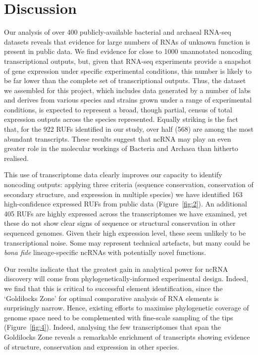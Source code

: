 \documentclass[10pt]{article}
\begin{document}
\section*{Discussion}

Our analysis of over 400 publicly-available bacterial and archaeal
RNA-seq datasets reveals that evidence for large numbers of RNAs of
unknown function is present in public data. We find evidence for close
to 1000 unannotated noncoding transcriptional outputs, but, given that
RNA-seq experiments provide a snapshot of gene expression under
specific experimental conditions, this number is likely to be far
lower than the complete set of transcriptional outputs. Thus, the
dataset we assembled for this project, which includes data generated
by a number of labs and derives from various species and strains grown
under a range of experimental conditions, is expected to represent a
broad, though partial, census of total expression outputs across the
species represented. Equally striking is the fact that, for the 922
RUFs identified in our study, over half (568) are among the most
abundant transcripts. These results suggest that ncRNA may play an
even greater role in the molecular workings of Bacteria and Archaea
than hitherto realised.

This use of transcriptome data clearly improves our capacity to
identify noncoding outputs: applying three criteria (sequence
conservation, conservation of secondary structure, and expression in
multiple species) we have identified 163 high-confidence expressed
RUFs from public data (Figure~\ref{fig:2}). An additional 405 RUFs are highly
expressed across the transcriptomes we have examined, yet these do not
show clear signs of sequence or structural conservation in other
sequenced genomes. Given their high expression level, these seem
unlikely to be transcriptional noise. Some may represent technical
artefacts, but many could be \emph{bona fide} lineage-specific ncRNAs with
potentially novel functions.

Our results indicate that the greatest gain in analytical power for
ncRNA discovery will come from phylogenetically-informed experimental
design. Indeed, we find that this is critical to successful element
identification, since the ‘Goldilocks Zone’ for optimal comparative
analysis of RNA elements is surprisingly narrow. Hence, existing
efforts to maximise phylogenetic coverage of genome space
\cite{Wu:2009,Rinke:2013} need to be complemented with fine-scale
sampling of the tips (Figure~\ref{fig:4}). Indeed, analysing the few
transcriptomes that span the Goldilocks Zone reveals a remarkable
enrichment of transcripts showing evidence of structure, conservation
and expression in other species.
\end{document}
